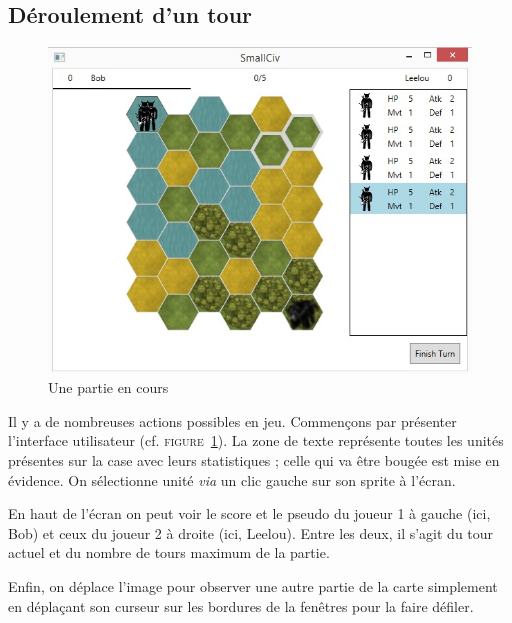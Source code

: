 \subsection{Déroulement d'un tour}
\begin{figure}[h]
	\centering
	\includegraphics{img/jeu.jpg}
	\caption{Une partie en cours}
	\label{in_game}
\end{figure}
Il y a de nombreuses actions possibles en jeu. Commençons par présenter l'interface utilisateur (cf. \textsc{figure~\ref{in_game}}). La zone de texte représente toutes les unités présentes sur la case avec leurs statistiques ; celle qui va être bougée est mise en évidence. On sélectionne unité \textit{via} un clic gauche sur son sprite à l'écran.\newline

En haut de l'écran on peut voir le score et le pseudo du joueur 1 à gauche (ici, Bob) et ceux du joueur 2 à droite (ici, Leelou). Entre les deux, il s'agit du tour actuel et du nombre de tours maximum de la partie. \newline

Enfin, on déplace l'image pour observer une autre partie de la carte simplement en déplaçant son curseur sur les bordures de la fenêtres pour la faire défiler. \newline

